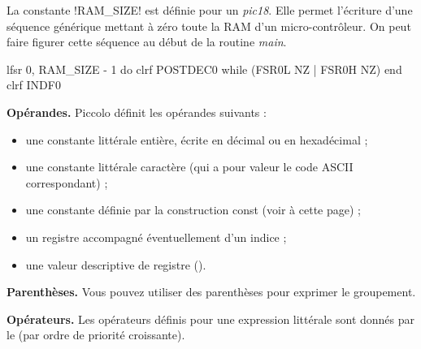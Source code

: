 La constante \pic!RAM_SIZE! est définie pour un \emph{pic18}. Elle permet l'écriture d'une séquence générique mettant à zéro toute la RAM d'un micro-contrôleur. On peut faire figurer cette séquence au début de la routine \emph{main}.


\begin{piccolo}
  lfsr 0, RAM_SIZE - 1
  do
    clrf POSTDEC0
  while (FSR0L NZ | FSR0H NZ)
  end
  clrf INDF0
\end{piccolo}



\textbf{Opérandes.} Piccolo définit les opérandes suivants :
\begin{itemize}
  \item une constante littérale entière, écrite en décimal ou en hexadécimal ;
  \item une constante littérale caractère (qui a pour valeur le code ASCII correspondant) ;
  \item une constante définie par la construction const (voir à cette page) ;
  \item un registre accompagné éventuellement d’un indice ;
  \item une valeur descriptive de registre ().
\end{itemize}

\textbf{Parenthèses.} Vous pouvez utiliser des parenthèses pour exprimer le groupement.

\textbf{Opérateurs.} Les opérateurs définis pour une expression littérale sont donnés par le  (par ordre de priorité croissante).

